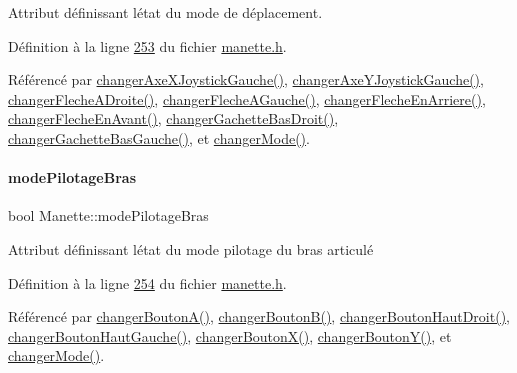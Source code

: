 Attribut définissant l\textquotesingle{}état du mode de déplacement. 



Définition à la ligne \hyperlink{manette_8h_source_l00253}{253} du fichier \hyperlink{manette_8h_source}{manette.\+h}.



Référencé par \hyperlink{manette_8cpp_source_l00421}{changer\+Axe\+X\+Joystick\+Gauche()}, \hyperlink{manette_8cpp_source_l00438}{changer\+Axe\+Y\+Joystick\+Gauche()}, \hyperlink{manette_8cpp_source_l00542}{changer\+Fleche\+A\+Droite()}, \hyperlink{manette_8cpp_source_l00533}{changer\+Fleche\+A\+Gauche()}, \hyperlink{manette_8cpp_source_l00524}{changer\+Fleche\+En\+Arriere()}, \hyperlink{manette_8cpp_source_l00515}{changer\+Fleche\+En\+Avant()}, \hyperlink{manette_8cpp_source_l00504}{changer\+Gachette\+Bas\+Droit()}, \hyperlink{manette_8cpp_source_l00493}{changer\+Gachette\+Bas\+Gauche()}, et \hyperlink{manette_8cpp_source_l00407}{changer\+Mode()}.

\mbox{\label{class_manette_acc2cd9afa45328c0da5c580e5c1a67db}} 
\paragraph{\texorpdfstring{mode\+Pilotage\+Bras}{modePilotageBras}}
{\footnotesize\ttfamily bool Manette\+::mode\+Pilotage\+Bras\hspace{0.3cm}{\ttfamily [private]}}



Attribut définissant l\textquotesingle{}état du mode pilotage du bras articulé 



Définition à la ligne \hyperlink{manette_8h_source_l00254}{254} du fichier \hyperlink{manette_8h_source}{manette.\+h}.



Référencé par \hyperlink{manette_8cpp_source_l00551}{changer\+Bouton\+A()}, \hyperlink{manette_8cpp_source_l00558}{changer\+Bouton\+B()}, \hyperlink{manette_8cpp_source_l00486}{changer\+Bouton\+Haut\+Droit()}, \hyperlink{manette_8cpp_source_l00479}{changer\+Bouton\+Haut\+Gauche()}, \hyperlink{manette_8cpp_source_l00565}{changer\+Bouton\+X()}, \hyperlink{manette_8cpp_source_l00572}{changer\+Bouton\+Y()}, et \hyperlink{manette_8cpp_source_l00407}{changer\+Mode()}.

